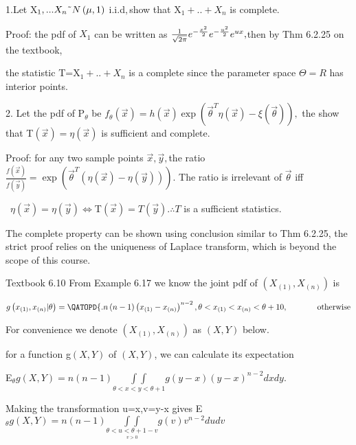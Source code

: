 \documentclass{article}
\begin{document}
1.Let X$_{1},...X_{n}\symbol{126}N\left( \mu ,1\right) $ i.i.d$,$show that X$%
_{1}+..+X_{n}$ is complete.

Proof: the pdf of $X_{1}$ can be written as $\frac{1}{\sqrt{2\pi }}e^{-\frac{%
x^{2}}{2}}e^{-\frac{u^{2}}{2}}e^{ux},$then by Thm 6.2.25 on the textbook,

the statistic T=X$_{1}+..+X_{n}$ is a complete since the parameter space $%
\Theta =R$ has interior points.

2. Let the pdf of P$_{\theta }$ be $f_{\theta }\left( \vec{x}\right)
=h\left( \vec{x}\right) \exp \left( \vec{\theta}^{T}\eta \left( \vec{x}%
\right) -\xi \left( \vec{\theta}\right) \right) ,$ the show that T$\left( 
\vec{x}\right) =\eta \left( \vec{x}\right) $ is sufficient and complete.

Proof: for any two sample points $\vec{x},\vec{y},$the ratio$\frac{f\left( 
\vec{x}\right) }{f\left( \vec{y}\right) }=\exp \left( \vec{\theta}^{T}\left(
\eta \left( \vec{x}\right) -\eta \left( \vec{y}\right) \right) \right) .$
The ratio is irrelevant of $\vec{\theta}$ iff

\bigskip\ $\eta \left( \vec{x}\right) =\eta \left( \vec{y}\right) \iff $T$%
\left( \vec{x}\right) =T\left( \vec{y}\right) .\therefore T$ is a sufficient
statistics.

\bigskip The complete property can be shown using conclusion similar to Thm
6.2.25, the strict proof relies on the uniqueness of Laplace transform,
which is beyond the scope of this course.

\bigskip

Textbook 6.10 From Example 6.17 we know the joint pdf of $\left( X_{\left(
1\right) },X_{\left( n\right) }\right) $ is

$g\left( x_{\left( 1\right) },x_{\left( n\right) }|\theta \right) =\QATOPD\{
. {n\left( n-1\right) \left( x_{\left( 1\right) }-x_{\left( n\right)
}\right) ^{n-2},\theta <x_{\left( 1\right) }<x_{\left( n\right) }<\theta
+1}{0,\text{ \ \ \ \ \ \ \ \ \ \ otherwise}}$

For convenience we denote $\left( X_{\left( 1\right) },X_{\left( n\right)
}\right) $ as $\left( X,Y\right) $ below.

for a function g$\left( X,Y\right) $ of $\left( X,Y\right) $, we can
calculate its expectation

E$_{\theta }g\left( X,Y\right) =n\left( n-1\right) \underset{\theta
<x<y<\theta +1}{\int \int }g\left( y-x\right) \left( y-x\right) ^{n-2}dxdy.$

Making the transformation u=x,v=y-x gives E$_{\theta }g\left( X,Y\right)
=n\left( n-1\right) \underset{\underset{v>0}{\theta <u<\theta +1-v}}{\int
\int }g\left( v\right) v^{n-2}dudv$
\end{document}
